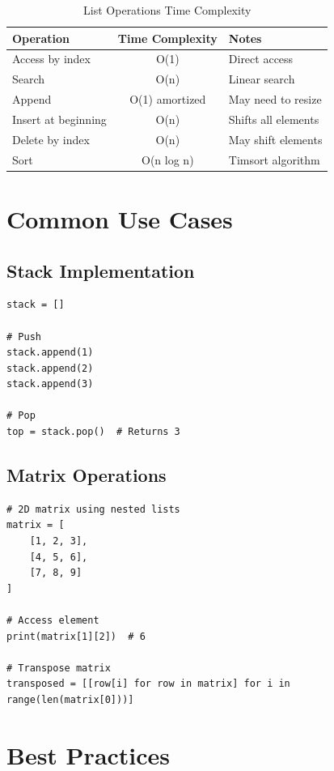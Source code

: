 \documentclass[12pt,a4paper]{article}
\begin{document}
\begin{table}[h]
\centering
\begin{tabular}{|l|c|l|}
\hline
\textbf{Operation} & \textbf{Time Complexity} & \textbf{Notes} \\
\hline
Access by index & O(1) & Direct access \\
Search & O(n) & Linear search \\
Append & O(1) amortized & May need to resize \\
Insert at beginning & O(n) & Shifts all elements \\
Delete by index & O(n) & May shift elements \\
Sort & O(n log n) & Timsort algorithm \\
\hline
\end{tabular}
\caption{List Operations Time Complexity}
\end{table}

\section{Common Use Cases}

\subsection{Stack Implementation}

\begin{lstlisting}
stack = []

# Push
stack.append(1)
stack.append(2)
stack.append(3)

# Pop
top = stack.pop()  # Returns 3
\end{lstlisting}

\subsection{Matrix Operations}

\begin{lstlisting}
# 2D matrix using nested lists
matrix = [
    [1, 2, 3],
    [4, 5, 6],
    [7, 8, 9]
]

# Access element
print(matrix[1][2])  # 6

# Transpose matrix
transposed = [[row[i] for row in matrix] for i in range(len(matrix[0]))]
\end{lstlisting}

\section{Best Practices}
\end{document}
